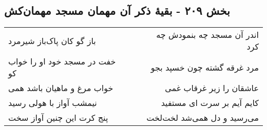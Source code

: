 \begin{center}
\section*{بخش ۲۰۹ - بقیهٔ ذکر آن مهمان مسجد مهمان‌کش}
\label{sec:sh209}
\begin{longtable}{l p{0.5cm} r}
باز گو کان پاک‌باز شیرمرد
&&
اندر آن مسجد چه بنمودش چه کرد
\\
خفت در مسجد خود او را خواب کو
&&
مرد غرقه گشته چون خسپد بجو
\\
خواب مرغ و ماهیان باشد همی
&&
عاشقان را زیر غرقاب غمی
\\
نیمشب آواز با هولی رسید
&&
کایم آیم بر سرت ای مستفید
\\
پنج کرت این چنین آواز سخت
&&
می‌رسید و دل همی‌شد لخت‌لخت
\\
\end{longtable}
\end{center}

